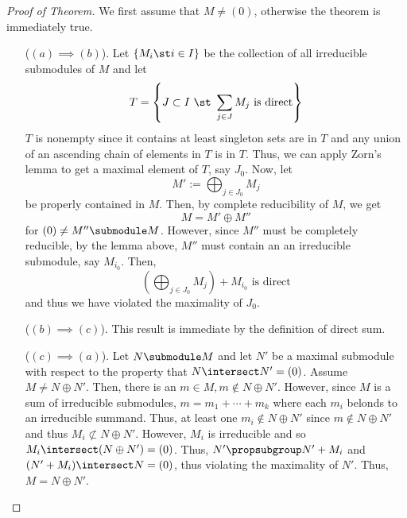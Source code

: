 \documentclass[11pt,leqno,oneside]{amsbook}
\numberwithin{thm}{section}
\begin{document}
\begin{proof}[Proof of Theorem]
  We first assume that \(M \neq (0)\), otherwise the theorem is
  immediately true.
  \begin{enumerate}
  \item[(\((a) \implies (b)\)).] Let \(\{M_i \st i \in I\}\) be the
    collection of all irreducible submodules of \(M\) and let \[
      T = \left\{J \subset I \ \st \ \sum_{j \in J} M_j \text{
          is direct} \right\}
    \]
    \(T\) is nonempty since it contains at least singleton sets are in
    \(T\) and any union
    of an ascending chain of elements in \(T\) is in \(T\). Thus, we
    can apply Zorn's lemma to get a maximal element of \(T\), say
    \(J_0\). Now, let \[
      M' := \bigoplus_{j \in J_0} M_j
    \]
    be properly contained in \(M\). Then, by complete reducibility of
    \(M\), we get \[
      M = M' \oplus M''
    \]
    for \((0) \neq M'' \submodule M\). However, 
    since \(M''\) must be completely reducible, by the lemma above,
    \(M''\) must contain an an irreducible submodule, say
    \(M_{i_0}\). Then, \[
      \left(\bigoplus_{j \in J_0} M_j \right) + M_{i_0} \text{ is direct}
    \]
    and thus we have violated the maximality of \(J_0\).
  \item[(\((b) \implies (c)\)).] This result is immediate by the
    definition of direct sum.
  \item[(\((c) \implies (a)\)).] Let \(N \submodule M\) and let \(N'\)
    be a maximal submodule with respect to the property that \(N
    \intersect N' = (0)\). Assume \(M \neq N \oplus N'\). Then, there
    is an \(m \in M, m \not \in N \oplus N'\). However, since \(M\) is
    a sum of irreducible submodules, \(m = m_1 + \cdots + m_k\) where
    each \(m_i\) belonds to an irreducible summand. Thus, at least one
    \(m_i \not \in N \oplus N'\) since \(m \not \in N \oplus N'\) and
    thus \(M_i \not \subset N \oplus N'\). However, \(M_i\) is
    irreducible and so \(M_i \intersect (N \oplus N') = (0)\). Thus,
    \(N' \propsubgroup N' + M_i\) and \((N'+M_i) \intersect N = (0)\),
    thus violating the maximality of \(N'\). Thus, \(M = N \oplus N'\).
  \end{enumerate}
\end{proof}
\end{document}
